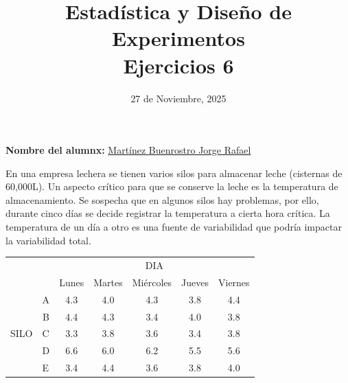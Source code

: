 \documentclass[12pt,a4paper]{article}
\title{Estadística y Diseño de Experimentos\\
Ejercicios 6}
\date{27 de Noviembre, 2025}
\author{}
\begin{document}
\maketitle

\noindent\textbf{Nombre del alumnx:} \underline{\hspace{0.5cm}Martínez Buenrostro Jorge Rafael\hspace{0.5cm}}

\vspace{1cm}

En una empresa lechera se tienen varios silos para almacenar leche (cisternas de 60,000L). Un aspecto crítico para que se conserve la leche es la temperatura de almacenamiento. Se sospecha que en algunos silos hay problemas, por ello, durante cinco días se decide registrar la temperatura a cierta hora crítica. La temperatura de un día a otro es una fuente de variabilidad que podría impactar la variabilidad total.

\begin{table}[H]
  \centering
\begin{tabular}{cc|ccccc}
     &                        & \multicolumn{5}{c}{DIA}                                           \\
     &                        & Lunes & Martes & Miércoles & Jueves & \multicolumn{1}{l}{Viernes} \\ \hline
     & A                      & 4.3   & 4.0    & 4.3       & 3.8    & 4.4                         \\
     & B                      & 4.4   & 4.3    & 3.4       & 4.0    & 3.8                         \\
SILO & \multicolumn{1}{l|}{C} & 3.3   & 3.8    & 3.6       & 3.4    & 3.8                         \\
     & \multicolumn{1}{l|}{D} & 6.6   & 6.0    & 6.2       & 5.5    & 5.6                         \\
     & \multicolumn{1}{l|}{E} & 3.4   & 4.4    & 3.6       & 3.8    & 4.0                         \\ \hline
\end{tabular}
\end{table}
\end{document}

